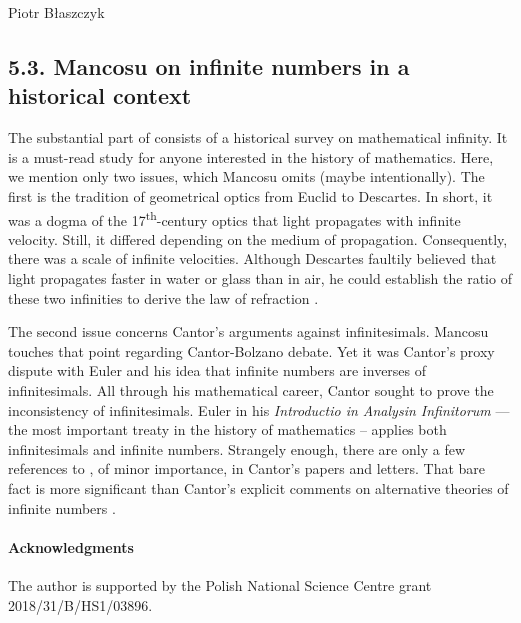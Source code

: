 \begin{artengenv}{Piotr Błaszczyk}
\subsection{5.3. Mancosu on infinite numbers in a historical context}

The substantial part of \parencite{ref_pm09} consists of a historical survey on mathematical infinity. It is a must-read study for anyone interested in the history of mathematics.  Here, we mention only two issues, which Mancosu omits (maybe intentionally). The first is the tradition of geometrical optics from Euclid to Descartes. In short, it was a dogma of the 17\textsuperscript{th}-century optics that light propagates with infinite velocity. Still, it differed depending on the medium of propagation. 
Consequently, there
was a scale of infinite velocities. Although Descartes faultily believed that light propagates
faster in water or glass than in air, he could establish the ratio of these two
infinities to derive the law of refraction \parencite[see][]{ref_pb20}.

The second issue concerns Cantor's arguments against infinitesimals. Mancosu touches that point regarding Cantor-Bolzano debate. Yet it was Cantor's proxy dispute with Euler and his idea that infinite numbers are inverses of infinitesimals. 
All through his mathematical career, Cantor sought to prove the inconsistency of infinitesimals. Euler in his \textit{Introductio in Analysin Infinitorum} \parencite*{ref_LE48}---the most important treaty in the history of mathematics --
applies both infinitesimals and infinite numbers. Strangely enough, there are only a few references to \parencite{ref_LE48}, of minor importance, in Cantor's papers and letters. 
That bare fact is more significant than Cantor's explicit comments on alternative theories of infinite numbers \parencite[see][]{ref_bf}.

\paragraph{Acknowledgments}
The author is supported by the Polish National Science Centre grant 2018/31/B/HS1/03896.


\end{artengenv}
